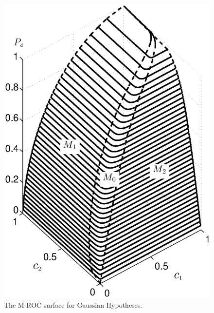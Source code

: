 \begin{figure}[!t]
\centering
\includegraphics[width=12cm]{3/ROC2.eps}
\caption{The M-ROC surface for Gaussian Hypotheses.}
\label{pic: LJS}
\end{figure}

